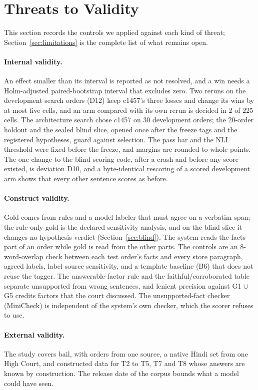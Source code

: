 \section{Threats to Validity}
\label{sec:threats}

This section records the controls we applied against each kind of threat; Section~\ref{sec:limitations} is the complete list of what remains open.

\paragraph{Internal validity.} An effect smaller than its interval is reported as not resolved, and a win needs a Holm-adjusted paired-bootstrap interval that excludes zero. Two reruns on the development search orders (D12) keep c1457's three losses and change its wins by at most five cells, and an arm compared with its own rerun is decided in 2 of 225 cells. The architecture search chose c1457 on 30 development orders; the 20-order holdout and the sealed blind slice, opened once after the freeze tags and the registered hypotheses, guard against selection. The pass bar and the NLI threshold were fixed before the freeze, and margins are rounded to whole points. The one change to the blind scoring code, after a crash and before any score existed, is deviation D10, and a byte-identical rescoring of a scored development arm shows that every other sentence scores as before.

\paragraph{Construct validity.} Gold comes from rules and a model labeler that must agree on a verbatim span; the rule-only gold is the declared sensitivity analysis, and on the blind slice it changes no hypothesis verdict (Section~\ref{sec:blind}). The system reads the facts part of an order while gold is read from the other parts. The controls are an 8-word-overlap check between each test order's facts and every store paragraph, agreed labels, label-source sensitivity, and a template baseline (B6) that does not reuse the tagger. The answerable-factor rule and the faithful/corroborated table separate unsupported from wrong sentences, and lenient precision against G1 $\cup$ G5 credits factors that the court discussed. The unsupported-fact checker (MiniCheck) is independent of the system's own checker, which the scorer refuses to use.

\paragraph{External validity.} The study covers bail, with orders from one source, a native Hindi set from one High Court, and constructed data for T2 to T5, T7 and T8 whose answers are known by construction. The release date of the corpus bounds what a model could have seen.
